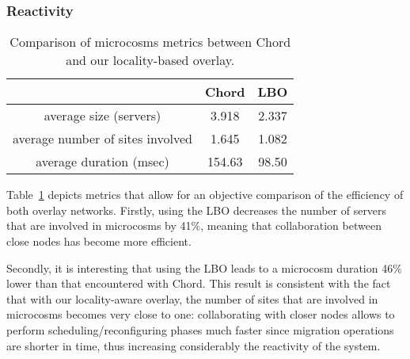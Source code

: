 \subsubsection{Reactivity}
\begin{table}[t!]

  \begin{center}
    \begin{tabular}{|c|c|c|}   

      \hline \multicolumn{1}{|p{3cm}|}{ }
       & \multicolumn{1}{|p{3cm}|}{\centering Chord }  & \multicolumn{1}{|p{3cm}|}{ \centering LBO}  \\

      \hline
      average size (servers) & 3.918 & 2.337 \\

      \hline
      average number of sites involved & 1.645 & 1.082 \\

      \hline
      average duration (msec) & 154.63 & 98.50 \\

      \hline
    \end{tabular}
  \end{center}
  \caption{\label{microcosm_table} Comparison of microcosms metrics between
    Chord and our locality-based overlay.}
\end{table}


Table~\ref{microcosm_table} depicts metrics that allow for an objective comparison of the
efficiency of both overlay networks. Firstly, using the LBO decreases the
number of servers that are involved in microcosms by 41\%, meaning that collaboration
between close nodes has become more efficient.

Secondly, it is interesting that using the LBO leads to a 
microcosm duration 46\% lower than that encountered with Chord. This result is consistent with 
the fact that with our locality-aware overlay, the number of sites that are involved in microcosms
becomes very close to one: collaborating with closer nodes allows
to perform scheduling/reconfiguring phases much faster since migration operations are
shorter in time, thus increasing considerably the reactivity of the system.

% 
